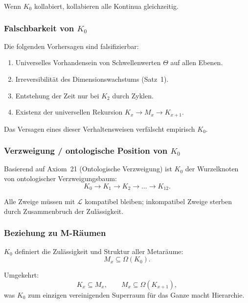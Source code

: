 Wenn $K_0$ kollabiert, kollabieren alle Kontinua gleichzeitig.

\subsubsection{Falschbarkeit von \texorpdfstring{$K_0$}{K_0}}

Die folgenden Vorhersagen sind falsifizierbar:
\begin{enumerate}
    \item Universelles Vorhandensein von Schwellenwerten $\Theta$ auf allen Ebenen.
    \item Irreversibilität des Dimensionswachstums (Satz~1).
    \item Entstehung der Zeit nur bei $K_2$ durch Zyklen.
    \item Existenz der universellen Rekursion $K_x\to M_x\to K_{x+1}$.
\end{enumerate}

Das Versagen eines dieser Verhaltensweisen verfälscht empirisch $K_0$.

\subsubsection{Verzweigung / ontologische Position von \texorpdfstring{$K_0$}{K_0}}

Basierend auf Axiom~21 (Ontologische Verzweigung) ist $K_0$ der Wurzelknoten von
ontologischer Verzweigungsbaum:
\[
K_0 \rightarrow K_1 \rightarrow K_2 \rightarrow \dots \rightarrow K_{12}.
\]

Alle Zweige müssen mit $\mathcal{L}$ kompatibel bleiben; inkompatibel
Zweige sterben durch Zusammenbruch der Zulässigkeit.

\subsubsection{Beziehung zu M-Räumen}

$K_0$ definiert die Zulässigkeit und Struktur aller Metaräume:
\[
M_x \subseteq \Omega(K_0).
\]

Umgekehrt:
\[
K_x \subseteq M_x,
\qquad
M_x \subseteq \Omega(K_{x+1}),
\]
was $K_0$ zum einzigen vereinigenden Superraum für das Ganze macht
Hierarchie.

